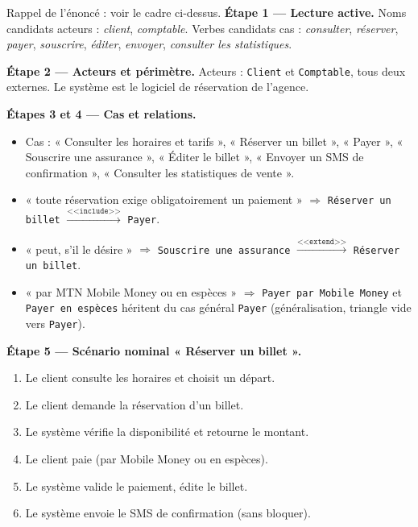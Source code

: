 \documentclass[11pt]{article}
\begin{document}
\begin{exoresolu}
Rappel de l'énoncé : voir le cadre ci-dessus.
\tcblower
\textbf{Étape 1 — Lecture active.} Noms candidats acteurs : \emph{client}, \emph{comptable}. Verbes candidats cas : \emph{consulter}, \emph{réserver}, \emph{payer}, \emph{souscrire}, \emph{éditer}, \emph{envoyer}, \emph{consulter les statistiques}.

\textbf{Étape 2 — Acteurs et périmètre.} Acteurs : \texttt{Client} et \texttt{Comptable}, tous deux externes. Le système est le logiciel de réservation de l'agence.

\textbf{Étapes 3 et 4 — Cas et relations.}
\begin{itemize}
\item Cas : « Consulter les horaires et tarifs », « Réserver un billet », « Payer », « Souscrire une assurance », « Éditer le billet », « Envoyer un SMS de confirmation », « Consulter les statistiques de vente ».
\item « toute réservation exige obligatoirement un paiement » $\Rightarrow$ \texttt{Réserver un billet} $\xrightarrow{\texttt{<<include>>}}$ \texttt{Payer}.
\item « peut, s'il le désire » $\Rightarrow$ \texttt{Souscrire une assurance} $\xrightarrow{\texttt{<<extend>>}}$ \texttt{Réserver un billet}.
\item « par MTN Mobile Money ou en espèces » $\Rightarrow$ \texttt{Payer par Mobile Money} et \texttt{Payer en espèces} héritent du cas général \texttt{Payer} (généralisation, triangle vide vers \texttt{Payer}).
\end{itemize}

\textbf{Étape 5 — Scénario nominal « Réserver un billet ».}
\begin{enumerate}
\item Le client consulte les horaires et choisit un départ.
\item Le client demande la réservation d'un billet.
\item Le système vérifie la disponibilité et retourne le montant.
\item Le client paie (par Mobile Money ou en espèces).
\item Le système valide le paiement, édite le billet.
\item Le système envoie le SMS de confirmation (sans bloquer).
\end{enumerate}


\end{exoresolu}
\end{document}
